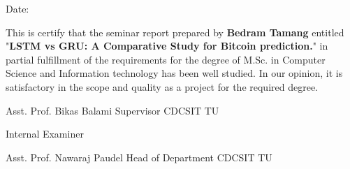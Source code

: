 \vspace{1cm}

\begin{flushright}
	Date: \dottedline{4cm}
\end{flushright}

\vspace{1cm}

This is certify that the seminar report prepared by \textbf{Bedram Tamang} entitled "\textbf{LSTM vs GRU: A Comparative Study for Bitcoin prediction.}" in partial fulfillment of the requirements for the degree of M.Sc. in Computer Science and Information technology has been well studied. In our opinion, it is satisfactory in the scope and quality as a project for the required degree. 

\vspace{2cm}

\begin{flushleft}
	\dottedline{5.8cm} \newline
	Asst. Prof. Bikas Balami \newline
	Supervisor \newline
	CDCSIT \newline
	TU \newline
\end{flushleft}

\vspace{2cm}

\begin{flushleft}
	\dottedline{5.8cm} \newline
	Internal Examiner
\end{flushleft}

\vspace{2cm}

\begin{flushleft}
	\dottedline{5.8cm} \newline       
	Asst. Prof. Nawaraj Paudel \newline
	Head of Department
	CDCSIT \newline
	TU \newline
\end{flushleft}

\clearpage